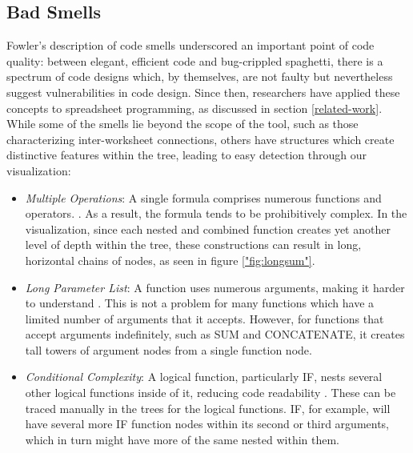 \documentclass[conference]{IEEEtran}
\begin{document}
	\subsection{Bad Smells} \label{badsmells} Fowler's description of code smells
	\cite{fowler2009refactoring} underscored an important point of code quality:
	between elegant, efficient code and bug-crippled spaghetti, there is a spectrum of code
	designs which, by themselves, are not faulty but nevertheless suggest vulnerabilities in code design. 	
	Since then, researchers have applied these concepts to spreadsheet programming, as 
	discussed in section \ref{related-work}. While some of the smells lie beyond the scope
	of the tool, such as those characterizing inter-worksheet connections, others
	have structures which create distinctive features within the tree, leading to
	easy detection through our visualization: \par
	
	\begin{itemize} 
		
		\item \textit{Multiple Operations}: A single formula comprises numerous
		functions and operators. \cite{hermans2012detecting}. As a result, the formula
		tends to be prohibitively complex. In the visualization, since each nested and
		combined function creates yet another level of depth within the tree, these
		constructions can result in long, horizontal chains of nodes, as seen in
		figure \ref{"fig:longsum"}.
		
		\item \textit{Long Parameter List}: A function uses numerous arguments, making
		it harder to understand \cite{asavametha2012detecting}. This is not a problem
		for many functions which have a limited number of arguments that it accepts. However,
		for functions that accept arguments indefinitely, such as SUM and CONCATENATE, it creates
		tall towers of argument nodes from a single function node.
		
		\item \textit{Conditional Complexity}: A logical function, particularly IF, nests
		several other logical functions inside of it, reducing code readability \cite{hermans2012detecting}. 
		These can be traced manually in the trees for the logical functions. IF, for example,
		will have several more IF function nodes within its second or third arguments, which
		in turn might have more of the same nested within them.
		
	\end{itemize}
	
\end{document}
